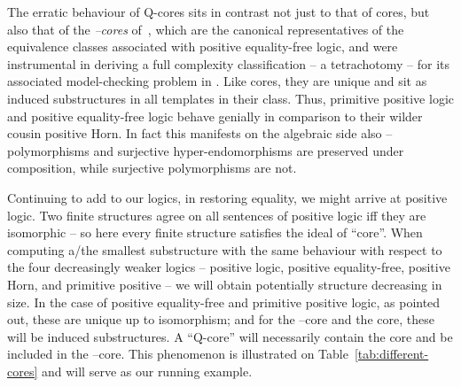 \documentclass{LMCS}
\begin{document}
The erratic behaviour of Q-cores sits in contrast not just to that of
cores, but also that of the \emph{--cores} of~\cite{LICS2011},
which are the canonical representatives of the equivalence classes
associated with positive equality-free logic,  and were instrumental in deriving a full complexity
classification -- a tetrachotomy -- for its associated model-checking problem in \cite{LICS2011}. 
Like cores, they are unique 
and sit as induced substructures in all templates in their
class. Thus, primitive positive logic and positive equality-free logic
behave genially in comparison to their wilder cousin positive Horn. In
fact this manifests on the algebraic side also -- polymorphisms and
surjective hyper-endomorphisms 
are preserved under composition, while surjective polymorphisms are not. 

Continuing to add to our logics, in restoring equality, we might
arrive at positive logic. Two finite structures agree on all sentences
of positive logic iff they are isomorphic -- so here every finite
structure satisfies the ideal of ``core''. 
When computing a/the smallest substructure with the same behaviour with
respect to the four decreasingly weaker logics -- positive logic,
positive equality-free, positive Horn, and primitive positive --
we will obtain potentially structure decreasing in size. In the case
of positive equality-free and primitive positive logic, as pointed
out, these are unique up to isomorphism; and for the --core
and the core, these will be induced substructures. A ``Q-core'' will
necessarily contain the core and be included in the --core.  
This phenomenon is illustrated on Table~\ref{tab:different-cores} and
will serve as our running example.
\end{document}
